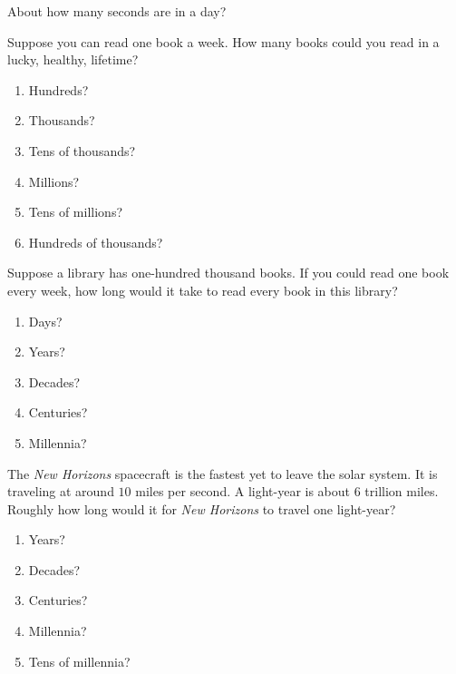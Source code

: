 \documentclass[noauthor]{ximera}
\author{Bart Snapp}
\begin{document}
\maketitle


\begin{exercise}
  About how many seconds are in a day?
\end{exercise}


\begin{exercise}
  Suppose you can read one book a week. How many books could you read
  in a lucky, healthy, lifetime?
  \begin{multicols}{2}
  \begin{enumerate}
  \item Hundreds?
  \item Thousands?
  \item Tens of thousands?
  \item Millions?
  \item Tens of millions?
  \item Hundreds of thousands?
  \end{enumerate}
  \end{multicols}
\end{exercise}


\begin{exercise}
  Suppose a library has one-hundred thousand books.  If you could read
  one book every week, how long would it take to read every book in
  this library?
  \begin{multicols}{2}
  \begin{enumerate}
  \item Days?
  \item Years?
  \item Decades?
  \item Centuries?
  \item Millennia?
 \end{enumerate}
 \end{multicols}
\end{exercise}


\begin{exercise}
  The \textit{New Horizons} spacecraft is the fastest yet to leave the
  solar system. It is traveling at around $10$ miles per second.
A light-year is about $6$ trillion miles.  Roughly how long would it for 
  \textit{New Horizons} to travel one light-year?
  \begin{multicols}{2}
  \begin{enumerate}
  \item Years?
  \item Decades?
  \item Centuries?
  \item Millennia?
  \item Tens of millennia?
 \end{enumerate}
 \end{multicols}
\end{exercise}
\end{document}
